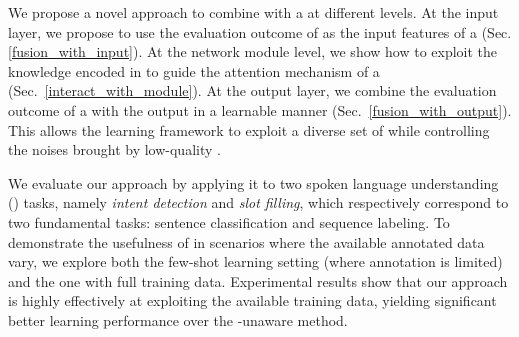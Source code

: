 


We propose a novel approach to combine \REs with a \NN at different levels. At the input layer, we propose to use the evaluation outcome of
\REs as the input features of a \NN (Sec.\ref{fusion_with_input}).
At the network module level, we show how to
exploit the knowledge encoded in \REs to guide the attention mechanism of a \NN (Sec.~\ref{interact_with_module}). At the output layer, we
combine the evaluation outcome of a \RE with the \NN output in a learnable manner (Sec.~\ref{fusion_with_output}). This allows the learning
framework to exploit a diverse set of \REs while controlling the noises brought by low-quality \REs.

%
We evaluate our approach by applying it to two spoken language understanding (\SLU) tasks, namely \emph{intent detection} and \emph{slot
filling}, which respectively correspond to two fundamental \NLP tasks: sentence classification and sequence labeling. To demonstrate the
usefulness of \REs in scenarios where the available annotated data vary, we explore both the few-shot learning setting (where annotation is
limited) and the one with full training data. Experimental results show that our approach is highly effectively at exploiting the available
training data, yielding significant better learning performance over the \RE-unaware method.


